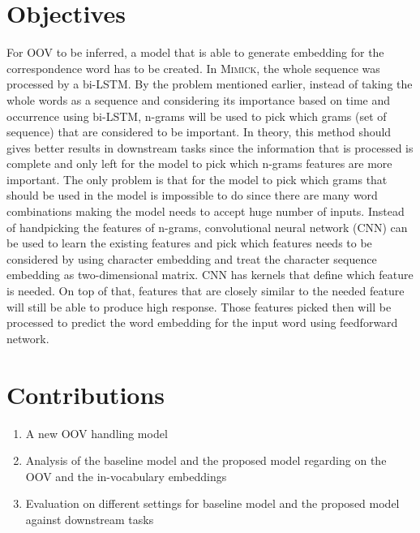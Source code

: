 \section{Objectives}
    For OOV to be inferred, a model that is able to generate embedding
    for the correspondence word has to be created. In \textsc{Mimick},
    the whole sequence was processed by a bi-LSTM. By the problem
    mentioned earlier, instead of taking the whole words as a sequence
    and considering its importance based on time and occurrence using
    bi-LSTM, n-grams will be used to pick which grams (set of
    sequence) that are considered to be important. In theory, this
    method should gives better results in downstream tasks since the
    information that is processed is complete and only left for the
    model to pick which n-grams features are more important. The only
    problem is that for the model to pick which grams that should be
    used in the model is impossible to do since there are many word
    combinations making the model needs to accept huge number of
    inputs. Instead of handpicking the features of n-grams,
    convolutional neural network (CNN) can be used to learn the
    existing features and pick which features needs to be considered
    by using character embedding and treat the character sequence
    embedding as two-dimensional matrix. CNN has kernels that define
    which feature is needed. On top of that, features that are closely
    similar to the needed feature will still be able to produce high
    response. Those features picked then will be processed to predict
    the word embedding for the input word using feedforward network.

\section{Contributions}
    \begin{enumerate}
        \item A new OOV handling model
        \item Analysis of the baseline model and the proposed model
        regarding on the OOV and the in-vocabulary embeddings
        \item Evaluation on different settings for baseline model and
        the proposed model against downstream tasks
    \end{enumerate}

